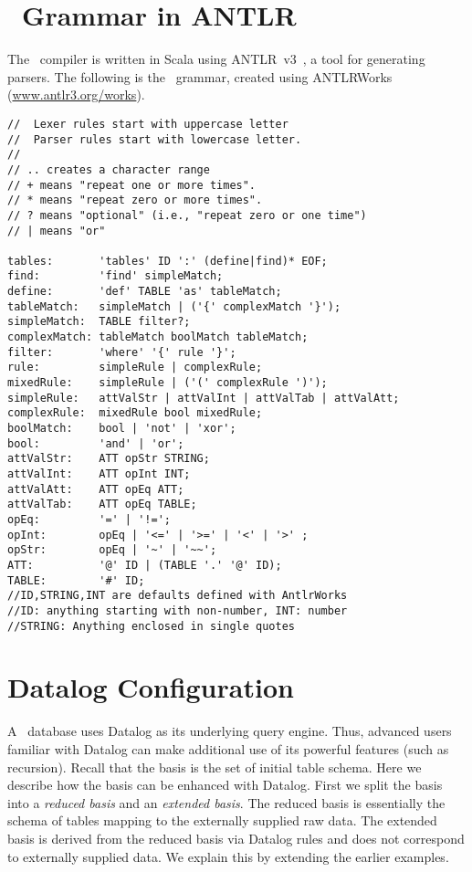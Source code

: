 \section{\dsl~Grammar in ANTLR}
\label{grammar}

The \dsl~compiler is written in Scala using ANTLR~v3~\cite{antlr}, a tool for generating parsers. The following is the \dsl~grammar, created using ANTLRWorks (\url{www.antlr3.org/works}). 
\begin{small}
\begin{verbatim}
//  Lexer rules start with uppercase letter
//  Parser rules start with lowercase letter.
//  
// .. creates a character range
// + means "repeat one or more times". 
// * means "repeat zero or more times".    
// ? means "optional" (i.e., "repeat zero or one time")
// | means "or"    

tables:       'tables' ID ':' (define|find)* EOF;
find:         'find' simpleMatch;
define:       'def' TABLE 'as' tableMatch;
tableMatch:   simpleMatch | ('{' complexMatch '}');
simpleMatch:  TABLE filter?;
complexMatch: tableMatch boolMatch tableMatch;
filter:       'where' '{' rule '}';
rule:         simpleRule | complexRule;
mixedRule:    simpleRule | ('(' complexRule ')');
simpleRule:   attValStr | attValInt | attValTab | attValAtt;
complexRule:  mixedRule bool mixedRule;
boolMatch:    bool | 'not' | 'xor';
bool:         'and' | 'or';
attValStr:    ATT opStr STRING;
attValInt:    ATT opInt INT;
attValAtt:    ATT opEq ATT;
attValTab:    ATT opEq TABLE;
opEq:         '=' | '!=';
opInt:        opEq | '<=' | '>=' | '<' | '>' ;
opStr:        opEq | '~' | '~~';
ATT:          '@' ID | (TABLE '.' '@' ID);
TABLE:        '#' ID;
//ID,STRING,INT are defaults defined with AntlrWorks
//ID: anything starting with non-number, INT: number
//STRING: Anything enclosed in single quotes
\end{verbatim}
\end{small}
\section{Datalog Configuration}
\label{basis}
A \dsl~database uses Datalog as its underlying query engine. Thus, advanced users familiar with Datalog can make additional use of its powerful features (such as recursion). Recall that the basis is the set of initial table schema. Here we describe how the basis can be enhanced with Datalog. First we split the basis into a {\em reduced basis} and an {\em extended basis}. The reduced basis is essentially the schema of tables mapping to the externally supplied raw data. The extended basis is derived from the reduced basis via Datalog rules and does not correspond to externally supplied data. We explain this by extending the earlier examples.

